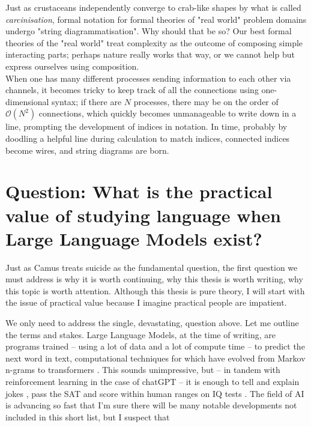 Just as crustaceans independently converge to crab-like shapes by what is called \emph{carcinisation}, formal notation for formal theories of "real world" problem domains undergo "string diagrammatisation". Why should that be so? Our best formal theories of the "real world" treat complexity as the outcome of composing simple interacting parts; perhaps nature really works that way, or we cannot help but express ourselves using composition.\\

When one has many different processes sending information to each other via channels, it becomes tricky to keep track of all the connections using one-dimensional syntax; if there are $N$ processes, there may be on the order of $\mathcal{O}(N^2)$ connections, which quickly becomes unmanageable to write down in a line, prompting the development of indices in notation. In time, probably by doodling a helpful line during calculation to match indices, connected indices become wires, and string diagrams are born.

\section{\textbf{Question:} What is the practical value of studying language when Large Language Models exist?}

Just as Camus treats suicide as the fundamental question, the first question we must address is why it is worth continuing, why this thesis is worth writing, why this topic is worth attention. Although this thesis is pure theory, I will start with the issue of practical value because I imagine practical people are impatient.

We only need to address the single, devastating, question above. Let me outline the terms and stakes. Large Language Models, at the time of writing, are programs trained -- using a lot of data and a lot of compute time -- to predict the next word in text, computational techniques for which have evolved from Markov n-grams to transformers \citep{vaswani_attention_2017}. This sounds unimpressive, but -- in tandem with reinforcement learning in the case of chatGPT \citep{openai_chatgpt_2022} -- it is enough to tell and explain jokes \citep{bastian_google_2022}, pass the SAT \citep{teddy_teddynpc_i_2022} and score within human ranges on IQ tests \citep{thompson_gpt-35_2022}. The field of AI is advancing so fast that I'm sure there will be many notable developments not included in this short list, but I suspect that\\

